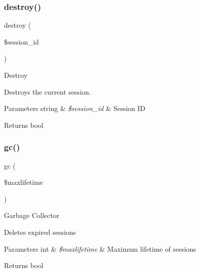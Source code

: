 \subsubsection{\texorpdfstring{destroy()}{destroy()}}
{\footnotesize\ttfamily destroy (\begin{DoxyParamCaption}\item[{}]{\$session\+\_\+id }\end{DoxyParamCaption})}

Destroy

Destroys the current session.


\begin{DoxyParams}[1]{Parameters}
string & {\em \$session\+\_\+id} & Session ID \\
\hline
\end{DoxyParams}
\begin{DoxyReturn}{Returns}
bool 
\end{DoxyReturn}
\mbox{\label{class_c_i___session__files__driver_a57aff7ee0656d8aa75d545fb8b3ae35d}} 
\subsubsection{\texorpdfstring{gc()}{gc()}}
{\footnotesize\ttfamily gc (\begin{DoxyParamCaption}\item[{}]{\$maxlifetime }\end{DoxyParamCaption})}

Garbage Collector

Deletes expired sessions


\begin{DoxyParams}[1]{Parameters}
int & {\em \$maxlifetime} & Maximum lifetime of sessions \\
\hline
\end{DoxyParams}
\begin{DoxyReturn}{Returns}
bool 
\end{DoxyReturn}
\mbox{\label{class_c_i___session__files__driver_a614b5cf3840833913c7a73260ed28e02}} 
